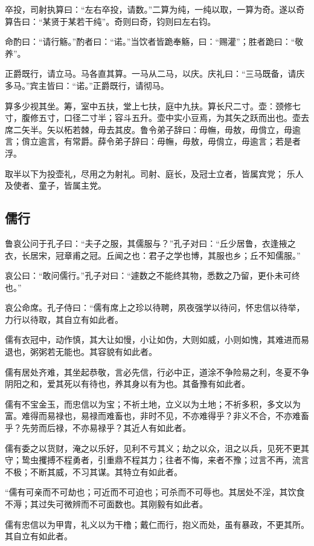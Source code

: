\documentclass[]{article}
\begin{document}
卒投，司射执算曰：``左右卒投，请数。''二算为纯，一纯以取，一算为奇。遂以奇算告曰：``某贤于某若干纯''。奇则曰奇，钧则曰左右钧。

命酌曰：``请行觞。''酌者曰：``诺。''当饮者皆跪奉觞，曰：``赐灌''；胜者跪曰：``敬养''。

正爵既行，请立马。马各直其算。一马从二马，以庆。庆礼曰：``三马既备，请庆多马。''宾主皆曰：``诺。''正爵既行，请彻马。

算多少视其坐。筹，室中五扶，堂上七扶，庭中九扶。算长尺二寸。壶：颈修七寸，腹修五寸，口径二寸半；容斗五升。壶中实小豆焉，为其矢之跃而出也。壶去席二矢半。矢以柘若棘，毋去其皮。鲁令弟子辞曰：毋幠，毋敖，毋偝立，毋逾言；偝立逾言，有常爵。薛令弟子辞曰：毋幠，毋敖，毋偝立，毋逾言；若是者浮。

取半以下为投壶礼，尽用之为射礼。司射、庭长，及冠士立者，皆属宾党；
乐人及使者、童子，皆属主党。

\hypertarget{header-n843}{%
\subsection{儒行}\label{header-n843}}

鲁哀公问于孔子曰：``夫子之服，其儒服与？''孔子对曰：``丘少居鲁，衣逢掖之衣，长居宋，冠章甫之冠。丘闻之也：君子之学也博，其服也乡；丘不知儒服。''

哀公曰：``敢问儒行。''孔子对曰：``遽数之不能终其物，悉数之乃留，更仆未可终也。''

哀公命席。孔子侍曰：``儒有席上之珍以待聘，夙夜强学以待问，怀忠信以待举，力行以待取，其自立有如此者。

儒有衣冠中，动作慎，其大让如慢，小让如伪，大则如威，小则如愧，其难进而易退也，粥粥若无能也。其容貌有如此者。

儒有居处齐难，其坐起恭敬，言必先信，行必中正，道涂不争险易之利，冬夏不争阴阳之和，爱其死以有待也，养其身以有为也。其备豫有如此者。

儒有不宝金玉，而忠信以为宝；不祈土地，立义以为土地；不祈多积，多文以为富。难得而易禄也，易禄而难畜也，非时不见，不亦难得乎？非义不合，不亦难畜乎？先劳而后禄，不亦易禄乎？其近人有如此者。

儒有委之以货财，淹之以乐好，见利不亏其义；劫之以众，沮之以兵，见死不更其守；鸷虫攫搏不程勇者，引重鼎不程其力；往者不悔，来者不豫；过言不再，流言不极；不断其威，不习其谋。其特立有如此者。

``儒有可亲而不可劫也；可近而不可迫也；可杀而不可辱也。其居处不淫，其饮食不溽；其过失可微辨而不可面数也。其刚毅有如此者。

儒有忠信以为甲胄，礼义以为干橹；戴仁而行，抱义而处，虽有暴政，不更其所。其自立有如此者。
\end{document}
